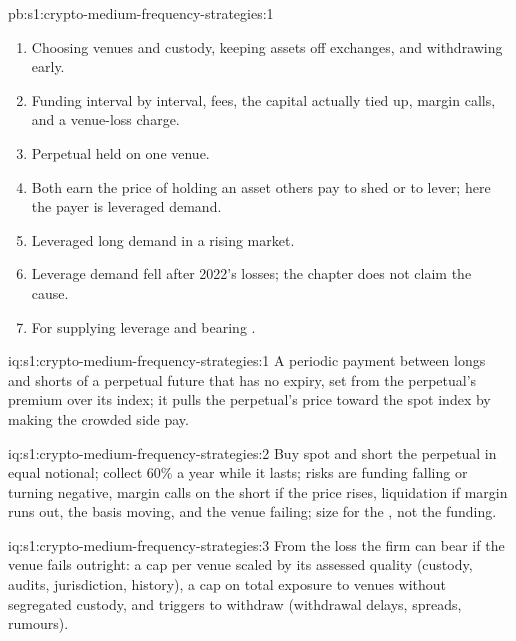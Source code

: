\begin{solution}{pb:s1:crypto-medium-frequency-strategies:1}
\begin{enumerate}
over four venues, it loses 20.2\% of capital when one fails, with an expected venue loss of 4.1\% a year.
\item Choosing venues and custody, keeping assets off exchanges, and withdrawing early.
\item Funding interval by interval, fees, the capital actually tied up, margin calls, and a venue-loss charge.
\item Perpetual  held on one venue.
\item Both earn the price of holding an asset others pay to shed or to lever; here the payer is leveraged demand.
\item Leveraged long demand in a rising market.
\item Leverage demand fell after 2022's losses; the chapter does not claim the cause.
\item For supplying leverage and bearing .
\end{enumerate}
\end{solution}

\begin{solution}{iq:s1:crypto-medium-frequency-strategies:1}
A periodic payment between longs and shorts of a perpetual future that has no expiry, set from the perpetual's premium over its index; it pulls the
perpetual's price toward the spot index by making the crowded side pay.
\end{solution}

\begin{solution}{iq:s1:crypto-medium-frequency-strategies:2}
Buy spot and short the perpetual in equal notional; collect 60\% a year while it lasts; risks are funding falling or turning negative, margin calls on the
short if the price rises, liquidation if margin runs out, the basis moving, and the venue failing; size for the , not the funding.
\end{solution}

\begin{solution}{iq:s1:crypto-medium-frequency-strategies:3}
From the loss the firm can bear if the venue fails outright: a cap per venue scaled by its assessed quality (custody, audits, jurisdiction, history), a
cap on total exposure to venues without segregated custody, and triggers to withdraw (withdrawal delays, spreads, rumours).
\end{solution}

